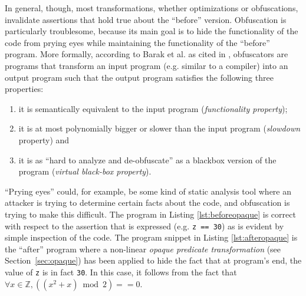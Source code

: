 \documentclass[compsoc,conference,a4paper,10pt,times]{IEEEtran}
\begin{document}
In general, though, most transformations, whether optimizations or obfuscations,
invalidate assertions that hold true about the ``before'' version. Obfuscation is particularly troublesome, because its main goal is to hide the functionality of the code from prying eyes while maintaining the functionality of the ``before'' program. More formally, according to Barak et al. as cited in \cite{BanescuCGNP16}, obfuscators are programs that transform an input program (e.g. similar to a compiler) into an output program such that the output program satisfies the following three properties:
\begin{enumerate}
   \item it is semantically equivalent to the input program (\emph{functionality property}); \label{itm:firstproperty}
   \item it is at most polynomially bigger or slower than the input program (\emph{slowdown} property) and \label{itm:secondproperty}
   \item it is as ``hard to analyze and de-obfuscate'' as a blackbox version of the program (\emph{virtual black-box property}). \label{itm:thirdproperty}
\end{enumerate}
``Prying eyes'' could, for example, be some kind of static analysis tool where an attacker is trying to determine certain facts about the code, and obfuscation is trying to make this difficult. The program in Listing \ref{lst:beforeopaque} is correct with respect to the assertion that is expressed (e.g. \texttt{z == 30}) as is evident by simple inspection of the code. The program snippet in Listing \ref{lst:afteropaque} is the ``after'' program where a non-linear \emph{opaque predicate transformation} (see Section~\ref{sec:opaque}) has been applied to hide the fact that at program's end, the value of \texttt{z} is in fact \texttt{30}. In this case, it follows from the fact that $\forall x \in \mathbb{Z}, ((x^2 + x)\bmod 2) == 0$. 
\end{document}
